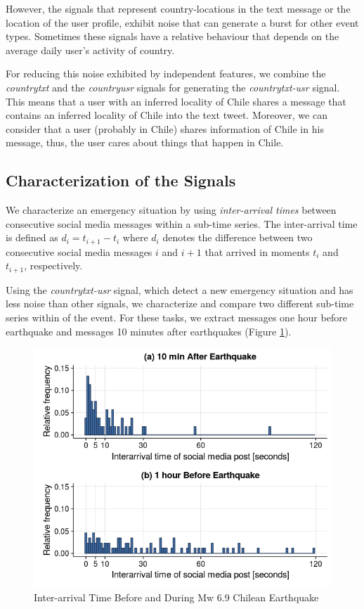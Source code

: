 \documentclass{ewic}
\begin{document}
However, the signals that represent country-locations in the text message or the location of the user profile, exhibit noise that can generate a burst for other event types. Sometimes these signals have a relative behaviour that depends on the average daily user's activity of country. 

For reducing this noise exhibited by independent features, we combine the \textit{countrytxt} and the \textit{countryusr} signals for generating the \textit{countrytxt-usr} signal. This means that a user with an inferred locality of Chile shares a message that contains an inferred locality of Chile into the text tweet. Moreover, we can consider that a user (probably in Chile) shares information of Chile in his message, thus, the user cares about things that happen in Chile.
\subsection{Characterization of the Signals}

We characterize an emergency situation by using \textit{inter-arrival times} between consecutive social media messages within a sub-time series. The inter-arrival time is defined as $d_{i} = t_{i+1} - t_{i}$ where $d_{i}$ denotes the difference between two consecutive social media messages $i$ and $i+1$ that arrived in moments $t_{i}$ and $t_{i+1}$, respectively.

Using the \textit{countrytxt-usr} signal, which detect a new emergency situation and has less noise than other signals, we characterize and compare two different sub-time series within of the event. For these tasks, we extract messages one hour before earthquake and messages 10 minutes after earthquakes (Figure \ref{interarrival}). 
\begin{figure}[h]
	\centering
	\includegraphics[width=\columnwidth]{img/interarrival.png}
	\caption{Inter-arrival Time Before and During Mw 6.9 Chilean Earthquake}
	\label{interarrival}
\end{figure}
\end{document}
